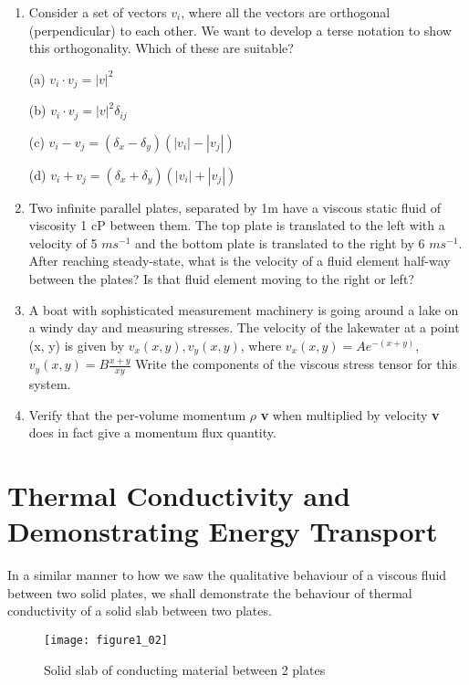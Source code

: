 \begin{enumerate}
    \item Consider a set of vectors {\textbf{$v_{i}$}}, where all the vectors are orthogonal (perpendicular) to each other. We want to develop a terse notation to show this orthogonality. Which of these are suitable?

        (a) $v_{i} \cdot v_{j} = |v|^{2}$

        (b) $v_{i} \cdot v_{j} = |v|^{2} \delta_{ij}$

        (c) $v_{i} - v_{j} = (\delta_{x} - \delta_{y})(|v_{i}| - |v_{j}|)$ 

        (d) $v_{i} + v_{j} = (\delta_{x} + \delta_{y})(|v_{i}| + |v_{j}|)$

    \item Two infinite parallel plates, separated by 1m have a viscous static fluid of viscosity 1 cP between them. The top plate is translated to the left with a velocity of 5 $m s^{-1}$ and the bottom plate is translated to the right by 6 $m s^{-1}$. After reaching steady-state, what is the velocity of a fluid element half-way between the plates? Is that fluid element moving to the right or left?

    \item A boat with sophisticated measurement machinery is going around a lake on a windy day and measuring stresses. The velocity of the lakewater at a point (x, y) is given by $v_{x}(x, y), v_{y}(x, y)$, where $v_{x}(x, y) = A e^{-(x+y)}$, $v_{y}(x,y) = B \frac{x + y}{xy}$ Write the components of the viscous stress tensor for this system. 

    \item Verify that the per-volume momentum $\rho$ \textbf{v} when multiplied by velocity \textbf{v} does in fact give a momentum flux quantity.

\end{enumerate}


\section{Thermal Conductivity and Demonstrating Energy Transport}

In a similar manner to how we saw the qualitative behaviour of a viscous fluid between two solid plates, we shall demonstrate the behaviour of thermal conductivity of a solid slab between two plates. 


\begin{figure}[h]
    \centering
    \texttt{[image: figure1\_02]}
    \caption{Solid slab of conducting material between 2 plates}
\end{figure}

